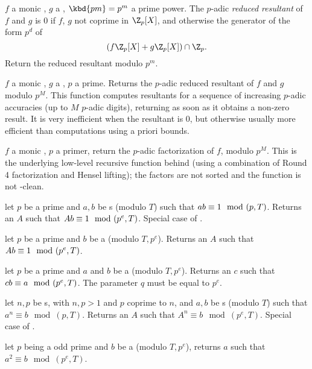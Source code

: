 $f$ a monic
, $g$ a , $\kbd{pm} = p^m$ a prime power. The $p$-adic
\emph{reduced resultant} of $f$ and $g$ is
$0$ if $f$, $g$ not coprime in $\Z_p[X]$, and otherwise the generator of the
form $p^d$ of
$$ (f\Z_p[X] + g\Z_p[X])\cap \Z_p. $$
Return the reduced resultant modulo $p^m$.

 $f$
a monic , $g$ a , $p$ a prime. Returns
the $p$-adic reduced resultant of $f$ and $g$ modulo $p^M$. This function
computes resultants for a sequence of increasing $p$-adic accuracies
(up to $M$ $p$-adic digits), returning as soon as it obtains a non-zero
result. It is very inefficient when the resultant is $0$, but otherwise
usually more efficient than computations using a priori bounds.

 $f$ a monic
, $p$ a primer, return the $p$-adic factorization of $f$, modulo
$p^M$. This is the underlying low-level recursive function behind
 (using a combination of Round 4 factorization and Hensel
lifting); the factors are not sorted and the function is not
-clean.


 let
$p$ be a prime  and $a,b$ be s (modulo $T$) such that $a\*b
\equiv 1 \mod (p,T)$.  Returns an  $A$ such that
$A\*b \equiv 1 \mod (p^e, T)$.  Special case of .

 let
$p$ be a prime  and $b$ be a  (modulo $T, p^e$).
Returns an  $A$ such that $A\*b \equiv 1 \mod (p^e, T)$.

 let
$p$ be a prime  and $a$ and $b$ be a  (modulo $T, p^e$).
Returns an  $c$ such that $c\*b \equiv a \mod (p^e, T)$.
The parameter $q$ must be equal to $p^e$.

 let
$n,p$ be s, with $n,p > 1$ and $p$ coprime to $n$, and $a,b$
be s (modulo $T$) such that $a^n \equiv b \mod (p,T)$.
Returns an  $A$ such that $A^n \equiv b \mod (p^e, T)$.
Special case of .

 let
$p$ being a odd prime and $b$ be a  (modulo $T, p^e$),
returns $a$ such that $a^2 \equiv b \mod (p^e, T)$.

